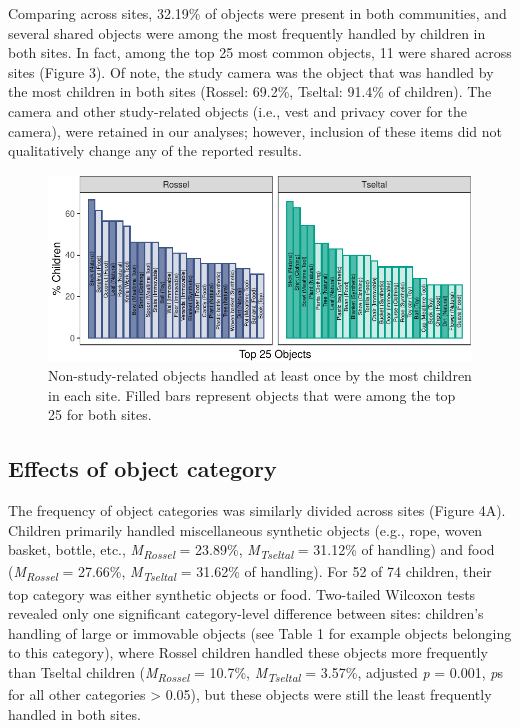 \documentclass[10pt, letterpaper]{article}
\newenvironment{CodeChunk}{}{}
\begin{document}
Comparing across sites, 32.19\% of objects were present in both
communities, and several shared objects were among the most frequently
handled by children in both sites. In fact, among the top 25 most common
objects, 11 were shared across sites (Figure 3). Of note, the study
camera was the object that was handled by the most children in both
sites (Rossel: 69.2\%, Tseltal: 91.4\% of children). The camera and
other study-related objects (i.e., vest and privacy cover for the
camera), were retained in our analyses; however, inclusion of these
items did not qualitatively change any of the reported results.

\begin{CodeChunk}
\begin{figure}[!ht]

{\centering \includegraphics{figs/top-objects-fig-1} 

}

\caption[Non-study-related objects handled at least once by the most children in each site]{Non-study-related objects handled at least once by the most children in each site. Filled bars represent objects that were among the top 25 for both sites.}\label{fig:top-objects-fig}
\end{figure}
\end{CodeChunk}

\hypertarget{effects-of-object-category}{%
\subsection{Effects of object
category}\label{effects-of-object-category}}

The frequency of object categories was similarly divided across sites
(Figure 4A). Children primarily handled miscellaneous synthetic objects
(e.g., rope, woven basket, bottle, etc.,
\emph{M}\textsubscript{\emph{Rossel}} = 23.89\%,
\emph{M}\textsubscript{\emph{Tseltal}} = 31.12\% of handling) and food
(\emph{M}\textsubscript{\emph{Rossel}} = 27.66\%,
\emph{M}\textsubscript{\emph{Tseltal}} = 31.62\% of handling). For 52 of
74 children, their top category was either synthetic objects or food.
Two-tailed Wilcoxon tests revealed only one significant category-level
difference between sites: children's handling of large or immovable
objects (see Table 1 for example objects belonging to this category),
where Rossel children handled these objects more frequently than Tseltal
children (\emph{M}\textsubscript{\emph{Rossel}} = 10.7\%,
\emph{M}\textsubscript{\emph{Tseltal}} = 3.57\%, adjusted \emph{p} =
0.001, \emph{p}s for all other categories \textgreater{} 0.05), but
these objects were still the least frequently handled in both sites.
\end{document}
